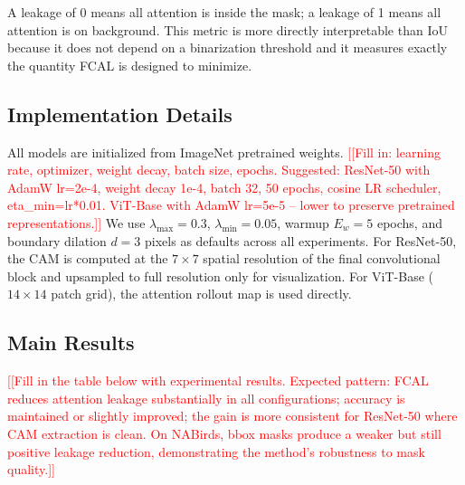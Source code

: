 \documentclass[journal]{IEEEtran}
\newcommand{\ph}[1]{\textcolor{red}{[#1]}}
\begin{document}
A leakage of 0 means all attention is inside the mask;
a leakage of 1 means all attention is on background.
This metric is more directly interpretable than IoU because it
does not depend on a binarization threshold and it measures
exactly the quantity FCAL is designed to minimize.

\subsection{Implementation Details}

All models are initialized from ImageNet pretrained weights.
\ph{[Fill in: learning rate, optimizer, weight decay, batch size,
epochs. Suggested: ResNet-50 with AdamW lr=2e-4, weight decay 1e-4,
batch 32, 50 epochs, cosine LR scheduler, eta\_min=lr*0.01.
ViT-Base with AdamW lr=5e-5 -- lower to preserve pretrained
representations.]}
We use $\lambda_{\max} = 0.3$, $\lambda_{\min} = 0.05$,
warmup $E_w = 5$ epochs, and boundary dilation $d = 3$ pixels
as defaults across all experiments. For ResNet-50, the CAM
is computed at the $7 \times 7$ spatial resolution of the final
convolutional block and upsampled to full resolution only for
visualization. For ViT-Base ($14 \times 14$ patch grid), the
attention rollout map is used directly.

\subsection{Main Results}

\ph{[Fill in the table below with experimental results. Expected
pattern: FCAL reduces attention leakage substantially in all
configurations; accuracy is maintained or slightly improved;
the gain is more consistent for ResNet-50 where CAM extraction
is clean. On NABirds, bbox masks produce a weaker but still
positive leakage reduction, demonstrating the method's
robustness to mask quality.]}
\end{document}
